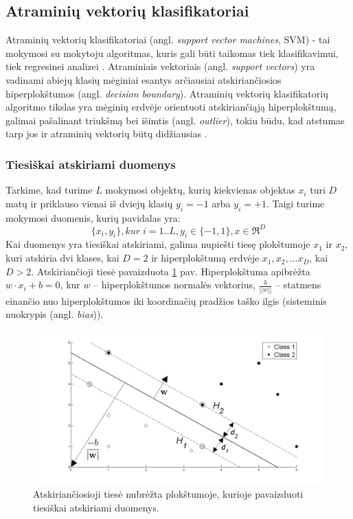 \subsection{Atraminių vektorių klasifikatoriai}

Atraminių vektorių klasifikatoriai (angl. \textit{support vector machines}, SVM) - tai mokymosi su mokytoju algoritmas, kuris gali būti taikomas tiek klasifikavimui, tiek regresinei analizei \cite{vapnik2000nature}. Atraminiais vektoriais (angl. \textit{support vectors}) yra vadinami abiejų klasių mėginiai esantys arčiausiai atskiriančiosios hiperplokštumos (angl. \textit{decision boundary}). Atraminių vektorių klasifikatorių algoritmo tikslas yra mėginių erdvėje orientuoti atskiriančiąją hiperplokštumą, galimai pašalinant triukšmą bei išimtis (angl. \textit{outlier}), tokiu būdu, kad atstumas tarp jos ir atraminių vektorių būtų didžiausias \cite{cortes1995support}. 

\subsubsection{Tiesiškai atskiriami duomenys}

Tarkime, kad turime $L$ mokymosi objektų, kurių kiekvienas objektas $x_i$ turi $D$ matų ir priklauso vienai iš dviejų klasių $y_i=-1$ arba $y_i=+1$. Taigi turime mokymosi duomenis, kurių pavidalas yra:
\begin{equation}
 \{x_i, y_i\}, kur\; i=1..L, y_i \in \{-1,1\}, x \in \Re^D
\end{equation}
Kai duomenys yra tiesiškai atskiriami, galima nupiešti tiesę plokštumoje $x_1$ ir $x_2$, kuri atskiria dvi klases, kai $D=2$ ir hiperplokštumą erdvėje $x_1, x_2,...x_D$, kai $D > 2$. Atskiriančioji tiesė pavaizduota \ref{fig:support_vector_machines} pav. Hiperplokštuma apibrėžta $w\cdot x_i + b = 0$, kur $w$ -- hiperplokštumos normalės vektorius, $\frac{b}{||w||}$ -- statmens einančio nuo hiperplokštumos iki koordinačių pradžios taško ilgis (sisteminis nuokrypis (angl. \textit{bias})).
\begin{figure}
 \centering
 \includegraphics[width=.7\textwidth]{images/support_vector_machines.jpg}
 \caption{Atskiriančiosioji tiesė nubrėžta plokštumoje, kurioje pavaizduoti tiesiškai atskiriami duomenys.}
 \label{fig:support_vector_machines}
\end{figure}

